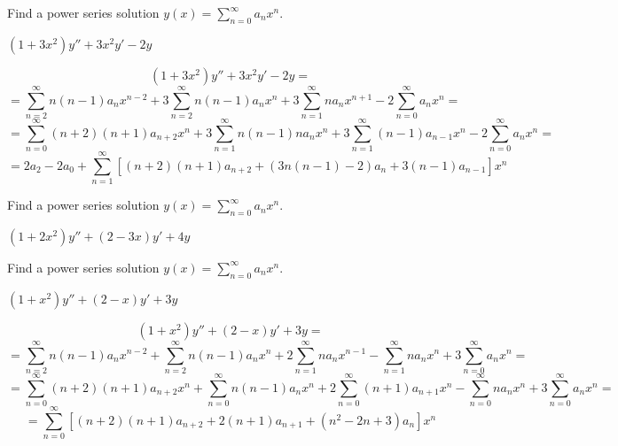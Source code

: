\documentclass{ximera}
\begin{document}
\begin{problem}\label{exer:7.1.12}
Find a power series solution $y(x)=\sum_{n=0}^\infty a_nx^n$.

$(1+3x^2)y''+3x^2y'-2y$

\begin{solution}
    $$(1+3x^2)y''+3x^2y'-2y=$$
$$=\sum_{n=2}^\infty n(n-1)a_nx^{n-2}
+3\sum_{n=2}^\infty n(n-1)a_nx^n
+3\sum_{n=1}^\infty na_nx^{n+1}-2\sum_{n=0}^\infty a_nx^n=$$
$$=\sum_{n=0}^\infty (n+2)(n+1)a_{n+2}x^n
+3\sum_{n=1}^\infty n(n-1)na_nx^n
+3\sum_{n=1}^\infty (n-1)a_{n-1}x^n-2\sum_{n=0}^\infty a_nx^n=$$
$$=2a_2-2a_0+\sum_{n=1}^\infty
[(n+2)(n+1)a_{n+2}+(3n(n-1)-2)a_n+3(n-1)a_{n-1}]x^n
$$
\end{solution}
\end{problem}

\begin{problem}\label{exer:7.1.13} 
Find a power series solution $y(x)=\sum_{n=0}^\infty a_nx^n$.

$(1+2x^2)y''+(2-3x)y'+4y$

\end{problem}

\begin{problem}\label{exer:7.1.14}
Find a power series solution $y(x)=\sum_{n=0}^\infty a_nx^n$.

$(1+x^2)y''+(2-x)y'+3y$

\begin{solution}
    $$(1+x^2)y''+(2-x)y'+3y=$$
$$=\sum_{n=2}^\infty n(n-1)a_nx^{n-2}
+\sum_{n=2}^\infty n(n-1)a_nx^n
+2\sum_{n=1}^\infty na_nx^{n-1}-\sum_{n=1}^\infty na_nx^n
+3\sum_{n=0}^\infty a_nx^n=$$
$$=\sum_{n=0}^\infty (n+2)(n+1)a_{n+2}x^n
+\sum_{n=0}^\infty n(n-1)a_nx^n
+2\sum_{n=0}^\infty (n+1)a_{n+1}x^n-\sum_{n=0}^\infty na_nx^n
+3\sum_{n=0}^\infty a_nx^n=$$
$$=\sum_{n=0}^\infty
\left[(n+2)(n+1)a_{n+2}+2(n+1)a_{n+1}+(n^2-2n+3)a_n\right]x^n
$$
\end{solution}
\end{problem}
\end{document}
